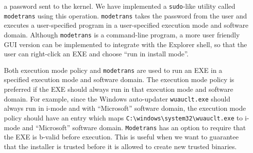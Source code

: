 \begin{description}
a password sent to the kernel.
We have implemented a {\tt sudo}-like utility called {\tt modetrans}
using this operation.
{\tt modetrans} takes the password from the user and
executes a user-specified program in a user-specified execution mode and software domain.
Although {\tt modetrans} is a command-line program,
a more user friendly GUI version can be implemented to
integrate with the Explorer shell, so that the user can right-click
an EXE and choose ``run in install mode''.

Both execution mode policy and {\tt modetrans} are used to run an EXE in a
specified execution mode and software domain.
The execution mode policy is preferred if the EXE should always run
in that execution mode and software domain.
For example, since the Windows auto-updater {\tt wuauclt.exe} should
always run in i-mode and with ``Microsoft'' software domain, the execution mode policy
should have an entry which maps \verb|C:\windows\system32\wuauclt.exe|
to i-mode and ``Microsoft'' software domain.
{\tt Modetrans} has an option to require that the EXE is b-valid
before execution.
This is useful when we want to guarantee that the installer
is trusted before it is allowed to create new trusted binaries.
\end{description}

